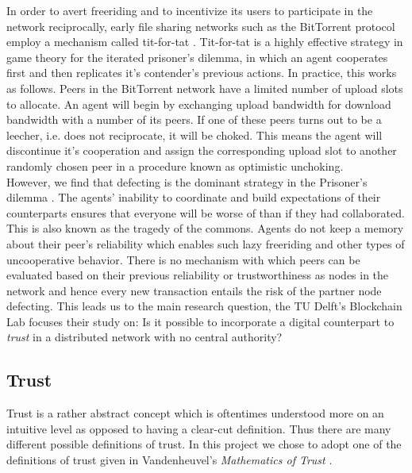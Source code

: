 \documentclass[twocolumn]{article}
\theoremstyle{definition}
\theoremstyle{theorem}
\begin{document}
\noindent In order to avert freeriding and to incentivize its users to participate in the network reciprocally, early file sharing networks such as the BitTorrent protocol employ a mechanism called tit-for-tat \cite{Peer-to-peer networking with BitTorrent}. Tit-for-tat is a highly effective strategy in game theory for the iterated prisoner's dilemma, in which an agent cooperates first and then replicates it's contender's previous actions. In practice, this works as follows. Peers in the BitTorrent network have a limited number of upload slots to allocate. An agent will begin by exchanging upload bandwidth for download bandwidth with a number of its peers. If one of these peers turns out to be a leecher, i.e. does not reciprocate, it will be choked. This means the agent will discontinue it's cooperation and assign the corresponding upload slot to another randomly chosen peer in a procedure known as optimistic unchoking. \vspace{1em}\\

\noindent However, we find that defecting is the dominant strategy in the Prisoner's dilemma \cite{An optimal strategy to solve the 
Prisoner's Dilemma}. The agents' inability to coordinate and build expectations of their counterparts ensures that everyone will be worse of than if they had collaborated. This is also known as the tragedy of the commons. Agents do not keep a memory about their peer's reliability which enables such lazy freeriding and other types of uncooperative behavior. There is no mechanism with which peers can be evaluated based on their previous reliability or trustworthiness as nodes in the network and hence every new transaction entails the risk of the partner node defecting. This leads us to the main research question, the TU Delft's Blockchain Lab focuses their study on: Is it possible to incorporate a digital counterpart to \textit{trust} in a distributed network with no central authority?

\subsection{Trust}
\label{subsec:Trust}
Trust is a rather abstract concept which is oftentimes understood more on an intuitive level as opposed to having a clear-cut definition. Thus there are many different possible definitions of trust. In this project we chose to adopt one of the definitions of trust given in Vandenheuvel's {\it Mathematics of Trust} \cite{Mathematics of Trust}.\\
\end{document}
